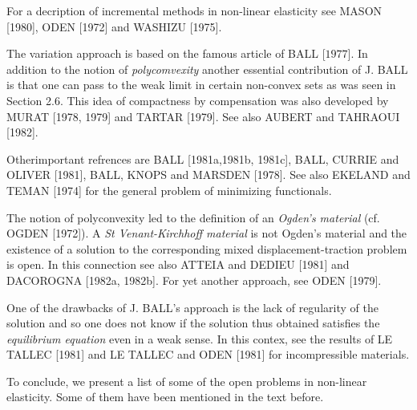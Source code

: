 For a decription of incremental methods in non-linear elasticity see
MASON [1980], ODEN [1972] and WASHIZU [1975].  

The variation approach is based on the famous article of BALL
[$1977$]. In addition to the notion of \textit{polycomvexity} another
essential contribution of J. BALL is that one can pass to the weak
limit in certain non-convex sets as was seen in Section 2.6. This
idea of compactness by compensation was also developed by MURAT
[1978, 1979] and TARTAR [1979]. See also AUBERT and TAHRAOUI
[1982].  

Other\pageoriginale important refrences are BALL [1981a,1981b, 1981c], BALL,
CURRIE and OLIVER [1981], BALL, KNOPS and MARSDEN [1978]. See also
EKELAND and TEMAN [1974] for the general problem of minimizing
functionals.  

The notion of polyconvexity led to the definition of an {\em Ogden's
material} (cf. OGDEN [1972]). A \textit{St Venant-Kirchhoff
  material} is not Ogden's material and the existence of a solution to
the corresponding mixed displacement-traction problem is open. In this
connection see also ATTEIA and DEDIEU [1981] and DACOROGNA [1982a,
  1982b]. For yet another approach, see ODEN [1979].  

One of the drawbacks of J. BALL's approach is the lack of regularity
of the solution and so one does not know if the solution thus obtained
satisfies the \textit{equilibrium equation} even in a weak sense. In
this contex, see the results of LE TALLEC [1981] and LE TALLEC and
ODEN [1981] for incompressible materials.  

To conclude, we present a list of some of the open problems in
non-linear elasticity. Some of them have been mentioned in the text
before.  

